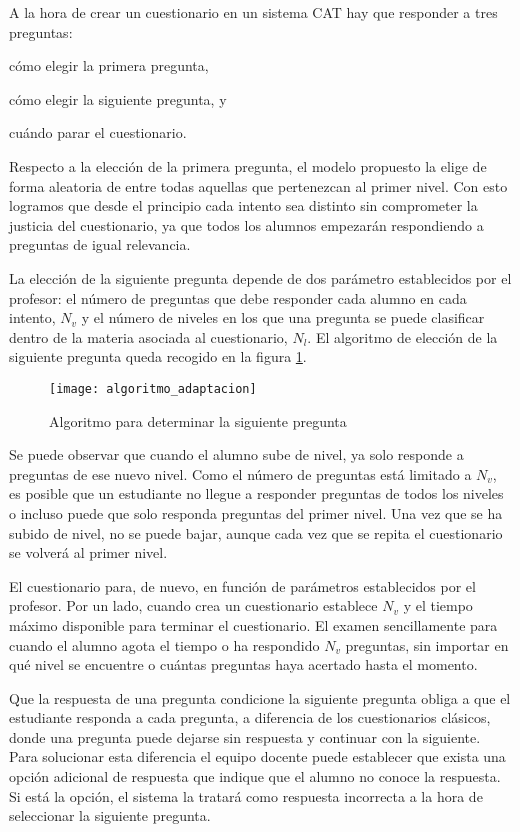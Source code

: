 A la hora de crear un cuestionario en un sistema \acrshort{CAT} hay que responder a tres preguntas:
\begin{enumerate*}[label=\alph*\upshape)]
\item cómo elegir la primera pregunta,
\item cómo elegir la siguiente pregunta, y
\item cuándo parar el cuestionario. 
\end{enumerate*}

Respecto a la elección de la primera pregunta, el modelo propuesto la elige de forma aleatoria de entre todas aquellas que pertenezcan al primer nivel. Con esto logramos que desde el principio cada intento sea distinto sin comprometer la justicia del cuestionario, ya que todos los alumnos empezarán respondiendo a preguntas de igual relevancia.

La elección de la siguiente pregunta depende de dos parámetro establecidos por el profesor: el número de preguntas que debe responder cada alumno en cada intento, $N_v$ y el número de niveles en los que una pregunta se puede clasificar dentro de la materia asociada al cuestionario, $N_l$. El algoritmo de elección de la siguiente pregunta queda recogido en la figura \ref{fig:algoritmo de adaptacion}.

\begin{figure}[htp!]
	\centering
	\texttt{[image: algoritmo\_adaptacion]}
	\caption{Algoritmo para determinar la siguiente pregunta}
	\label{fig:algoritmo de adaptacion}
\end{figure}

Se puede observar que cuando el alumno sube de nivel, ya solo responde a preguntas de ese nuevo nivel. Como el número de preguntas está limitado a $N_v$, es posible que un estudiante no llegue a responder preguntas de todos los niveles o incluso puede que solo responda preguntas del primer nivel. Una vez que se ha subido de nivel, no se puede bajar, aunque cada vez que se repita el cuestionario se volverá al primer nivel.

El cuestionario para, de nuevo, en función de parámetros establecidos por el profesor. Por un lado, cuando crea un cuestionario establece $N_v$ y el tiempo máximo disponible para terminar el cuestionario. El examen sencillamente para cuando el alumno agota el tiempo o ha respondido $N_v$ preguntas, sin importar en qué nivel se encuentre o cuántas preguntas haya acertado hasta el momento.

Que la respuesta de una pregunta condicione la siguiente pregunta obliga a que el estudiante responda a cada pregunta, a diferencia de los cuestionarios clásicos, donde una pregunta puede dejarse sin respuesta y continuar con la siguiente. Para solucionar esta diferencia el equipo docente puede establecer que exista una opción adicional de respuesta que indique que el alumno no conoce la respuesta. Si está la opción, el sistema la tratará como respuesta incorrecta a la hora de seleccionar la siguiente pregunta.

